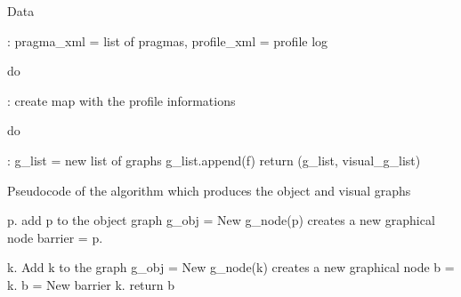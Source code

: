 \documentclass[a4paper,11pt,oneside]{book}
\begin{document}
\begin{algorithm}[H]
\begin{algorithmic}
\State \begin{bf}Data\end{bf}: pragma\_xml = list of pragmas, profile\_xml = profile log
\State \begin{bf}do\end{bf}: create map with the profile informations
\State \begin{bf}do\end{bf}: g\_list = new list of graphs
\State g\_list.append(f)  
\State {} 
\EndFor
\State return (g\_list, visual\_g\_list) 
\EndFunction
\end{algorithmic}
\caption{Pseudocode of the algorithm which produces the object and visual graphs}
\begin{algorithmic}
\State p.
\State add p to the object graph
\State g\_obj = New g\_node(p) \Comment creates a new graphical node
\State barrier = 
\State p.
\EndIf
\EndFor
\EndFunction
\end{algorithmic}

\begin{algorithmic}
\State k.
\State Add k to the graph
\State g\_obj = New g\_node(k) \Comment creates a new graphical node
\State b = 
\State k.
\Else 
\State b = New barrier
\State k.
\EndIf
\EndFor
\State return b
\EndFunction

\end{algorithmic}
\end{algorithm}
\end{document}
